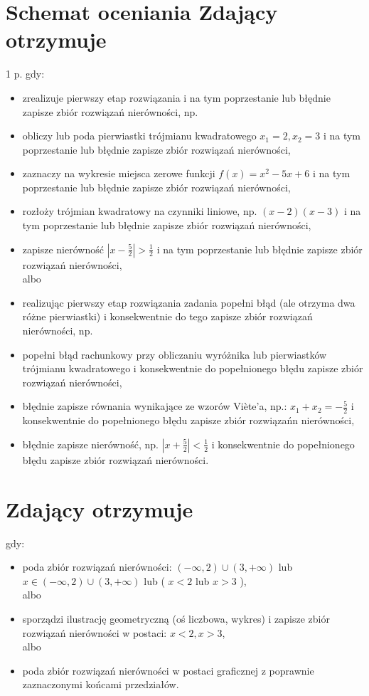 \documentclass[10pt]{article}
\begin{document}
\section*{Schemat oceniania Zdający otrzymuje}
 1 p. gdy:\begin{itemize}
  \item zrealizuje pierwszy etap rozwiązania i na tym poprzestanie lub błędnie zapisze zbiór rozwiązań nierówności, np.
  \item obliczy lub poda pierwiastki trójmianu kwadratowego $x_{1}=2, x_{2}=3$ i na tym poprzestanie lub błędnie zapisze zbiór rozwiązań nierówności,
  \item zaznaczy na wykresie miejsca zerowe funkcji $f(x)=x^{2}-5 x+6$ i na tym poprzestanie lub błędnie zapisze zbiór rozwiązań nierówności,
  \item rozłoży trójmian kwadratowy na czynniki liniowe, np. $(x-2)(x-3)$ i na tym poprzestanie lub błędnie zapisze zbiór rozwiązań nierówności,
  \item zapisze nierówność $\left|x-\frac{5}{2}\right|>\frac{1}{2}$ i na tym poprzestanie lub błędnie zapisze zbiór rozwiązań nierówności,\\
albo
  \item realizując pierwszy etap rozwiązania zadania popełni błąd (ale otrzyma dwa różne pierwiastki) i konsekwentnie do tego zapisze zbiór rozwiązań nierówności, np.
  \item popełni błąd rachunkowy przy obliczaniu wyróżnika lub pierwiastków trójmianu kwadratowego i konsekwentnie do popełnionego błędu zapisze zbiór rozwiązań nierówności,
  \item błędnie zapisze równania wynikające ze wzorów Viète'a, np.: $x_{1}+x_{2}=-\frac{5}{2}$ i konsekwentnie do popełnionego błędu zapisze zbiór rozwiązańn nierówności,
  \item błędnie zapisze nierówność, np. $\left|x+\frac{5}{2}\right|<\frac{1}{2}$ i konsekwentnie do popełnionego błędu zapisze zbiór rozwiązań nierówności.
\end{itemize}

\section*{Zdający otrzymuje}
gdy:

\begin{itemize}
  \item poda zbiór rozwiązań nierówności: $(-\infty, 2) \cup(3,+\infty)$ lub $x \in(-\infty, 2) \cup(3,+\infty)$ lub ( $x<2$ lub $x>3$ ),\\
albo
  \item sporządzi ilustrację geometryczną (oś liczbowa, wykres) i zapisze zbiór rozwiązań nierówności w postaci: $x<2, x>3$,\\
albo
  \item poda zbiór rozwiązań nierówności w postaci graficznej z poprawnie zaznaczonymi końcami przedziałów.
\end{itemize}
\end{document}
